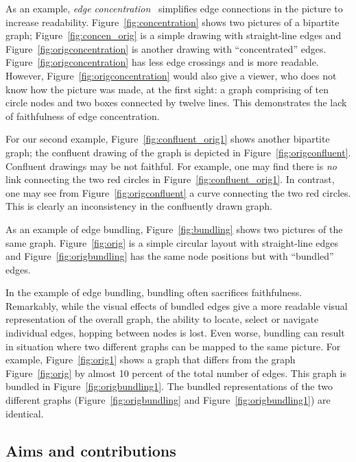 \documentclass[10pt,journal,cspaper,compsoc]{IEEEtran}
\begin{document}
As an example, \emph{edge concentration}~\cite{newbery1989edge}
simplifies edge connections in the picture to increase readability.
Figure~\ref{fig:concentration} shows two pictures of a bipartite graph;
Figure~\ref{fig:concen_orig} is a simple drawing with straight-line edges
and Figure~\ref{fig:origconcentration} is another drawing with ``concentrated'' edges. Figure~\ref{fig:origconcentration} has less edge crossings and is more readable. However, Figure~\ref{fig:origconcentration} would also give a viewer, who does not know how the picture was made, at the first sight: a graph comprising of ten circle nodes and two boxes connected by twelve lines. This demonstrates the lack of faithfulness of edge concentration.


For our second example, Figure~\ref{fig:confluent_orig1} shows another bipartite graph; the confluent drawing of the graph is depicted in Figure~\ref{fig:origconfluent}. Confluent drawings may be not faithful. For example, one may find there is \emph{no} link connecting the two red circles in Figure~\ref{fig:confluent_orig1}. In contrast, one may see from Figure~\ref{fig:origconfluent} a curve connecting the two red circles. This is clearly an inconsistency in the confluently drawn graph.



As an example of edge bundling, Figure~\ref{fig:bundling} shows two pictures of the same graph.
Figure~\ref{fig:orig} is a simple circular layout with straight-line edges
and Figure~\ref{fig:origbundling} has the same node positions but with ``bundled'' edges.


In the example of edge bundling, bundling often sacrifices faithfulness. Remarkably, while the visual effects of bundled edges give a more readable visual representation of the overall graph, the ability to locate, select or navigate individual edges, hopping between nodes is lost. Even worse, bundling can result in situation where two different graphs can be mapped to the same picture. For example, Figure~\ref{fig:orig1} shows a graph that differs from the
graph Figure~\ref{fig:orig} by almost 10 percent of the total number of edges. This graph is bundled in Figure~\ref{fig:origbundling1}.
The bundled representations of the two different graphs (Figure~\ref{fig:origbundling} and 
Figure~\ref{fig:origbundling1}) are identical. 


\subsection{Aims and contributions}
\end{document}
